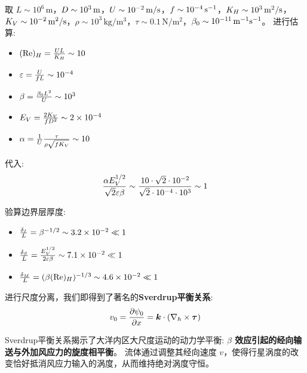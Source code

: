 \begin{proofbox}[尺度分析]
    取 $L \sim 10^6\,\mathrm{m}$，$D \sim 10^3\,\mathrm{m}$，$U \sim 10^{-2}\,\mathrm{m/s}$，$f \sim 10^{-4}\,\mathrm{s^{-1}}$，$K_H \sim 10^{3}\,\mathrm{m^2/s}$，$K_V \sim 10^{-2}\,\mathrm{m^2/s}$，$\rho \sim 10^3\,\mathrm{kg/m^3}$，$\tau \sim 0.1\,\mathrm{N/m^2}$，$\beta_0 \sim 10^{-11}\,\mathrm{m^{-1} s^{-1}}$。
    进行估算:
    \begin{itemize}
        \item $(\text{Re})_H = \frac{U L}{K_H} \sim 10$
        \item $\varepsilon = \frac{U}{f L} \sim 10^{-4}$
        \item $\beta = \frac{\beta_0 L^2}{U} \sim 10^3$
        \item $E_V = \frac{2K_V}{f D^2} \sim 2 \times 10^{-4}$
        \item $\alpha = \frac{1}{U} \frac{\tau}{\rho \sqrt{f K_V}} \sim 10$
    \end{itemize}

    代入:
    \begin{equation*}
        \frac{\alpha E_V^{1/2}}{\sqrt{2} \varepsilon \beta} \sim \frac{10 \cdot \sqrt{2} \cdot 10^{-2}}{\sqrt{2} \cdot 10^{-4} \cdot 10^3} \sim 1
    \end{equation*}

    验算边界层厚度:
    \begin{itemize}
        \item $\frac{\delta_I}{L} = \beta^{-1/2} \sim 3.2 \times 10^{-2} \ll 1$
        \item $\frac{\delta_S}{L} = \frac{E_V^{1/2}}{2 \varepsilon \beta} \sim 7.1 \times 10^{-2} \ll 1$
        \item $\frac{\delta_M}{L} = (\beta (\text{Re})_H)^{-1/3} \sim 4.6 \times 10^{-2} \ll 1$
    \end{itemize}
\end{proofbox}

进行尺度分离，我们即得到了著名的\textbf{Sverdrup平衡关系}:
\begin{equation}
    v_0 = \pde{\streamfunc_0}{x} = \kvec \cdot (\nabla_h \times \wind)
    \label{eq:sverdrup_balance}
\end{equation}

Sverdrup平衡关系揭示了大洋内区大尺度运动的动力学平衡: \textbf{$\beta$ 效应引起的经向输送与外加风应力的旋度相平衡}。
流体通过调整其经向速度 $v$，使得行星涡度的改变恰好抵消风应力输入的涡度，从而维持绝对涡度守恒。

